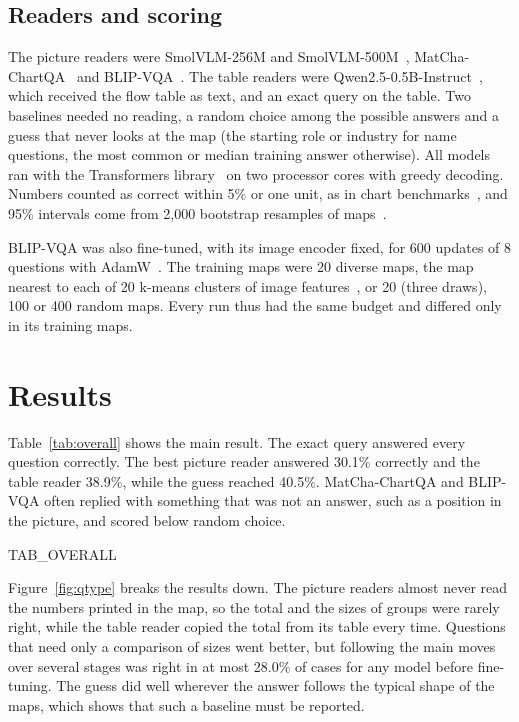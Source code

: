 \documentclass[preprints,article,accept,moreauthors]{Definitions/mdpi}
\begin{document}
\subsection{Readers and scoring}

The picture readers were SmolVLM-256M and SmolVLM-500M~\cite{marafioti2025}, MatCha-ChartQA~\cite{liu2023matcha,lee2023pix2struct} and BLIP-VQA~\cite{li2022blip}. The table readers were Qwen2.5-0.5B-Instruct~\cite{qwen2025}, which received the flow table as text, and an exact query on the table. Two baselines needed no reading, a random choice among the possible answers and a guess that never looks at the map (the starting role or industry for name questions, the most common or median training answer otherwise). All models ran with the Transformers library~\cite{wolf2020} on two processor cores with greedy decoding. Numbers counted as correct within 5\% or one unit, as in chart benchmarks~\cite{methani2020,masry2022}, and 95\% intervals come from 2,000 bootstrap resamples of maps~\cite{efron1979}.

BLIP-VQA was also fine-tuned, with its image encoder fixed, for 600 updates of 8 questions with AdamW~\cite{loshchilov2019}. The training maps were 20 diverse maps, the map nearest to each of 20 k-means clusters of image features~\cite{lloyd1982,sener2018}, or 20 (three draws), 100 or 400 random maps. Every run thus had the same budget and differed only in its training maps.

\section{Results}

Table~\ref{tab:overall} shows the main result. The exact query answered every question correctly. The best picture reader answered 30.1\% correctly and the table reader 38.9\%, while the guess reached 40.5\%. MatCha-ChartQA and BLIP-VQA often replied with something that was not an answer, such as a position in the picture, and scored below random choice.

{{TAB_OVERALL}}

Figure~\ref{fig:qtype} breaks the results down. The picture readers almost never read the numbers printed in the map, so the total and the sizes of groups were rarely right, while the table reader copied the total from its table every time. Questions that need only a comparison of sizes went better, but following the main moves over several stages was right in at most 28.0\% of cases for any model before fine-tuning. The guess did well wherever the answer follows the typical shape of the maps, which shows that such a baseline must be reported.
\end{document}
